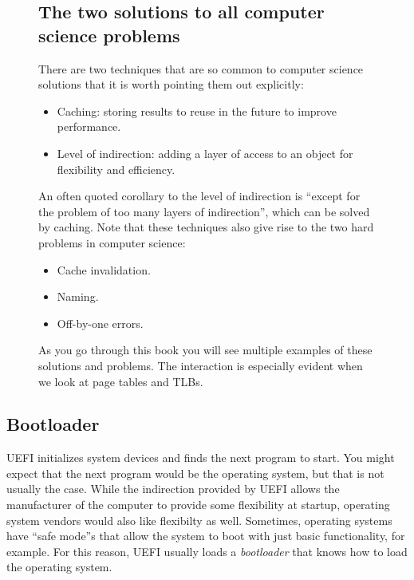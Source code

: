 \documentclass{article}
\begin{document}
\begin{figure}
\begin{boxed}
\subsection*{The two solutions to all computer science problems}

There are two techniques that are so common to computer science solutions that it is worth pointing them out explicitly:

\begin{itemize}
\setlength\itemsep{0em}
    \item Caching: storing results to reuse in the future to improve performance.
    \item Level of indirection: adding a layer of access to an object for flexibility and efficiency.
\end{itemize}

An often quoted corollary to the level of indirection is ``except for the problem of too many layers of indirection'', which can be solved by caching. Note that these techniques also give rise to the two hard problems in computer science:

\begin{itemize}
\setlength\itemsep{0em}
    \item Cache invalidation.
    \item Naming.
    \item Off-by-one errors.
\end{itemize}

As you go through this book you will see multiple examples of these solutions and problems.
The interaction is especially evident when we look at page tables and TLBs.
\end{boxed}
\end{figure}

\subsection{Bootloader}

UEFI initializes system devices and finds the next program to start.
You might expect that the next program would be the operating system, but that is not usually the case.
While the indirection provided by UEFI allows the manufacturer of the computer to provide some flexibility at startup, operating system vendors would also like flexibilty as well.
Sometimes, operating systems have ``safe mode''s that allow the system to boot with just basic functionality, for example.
For this reason, UEFI usually loads a \emph{bootloader} that knows how to load the operating system.
\end{document}
